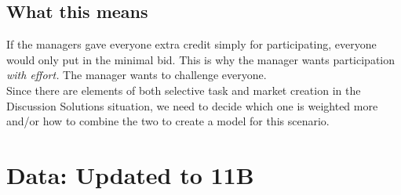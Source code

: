 \documentclass[leqno]{article}
\begin{document}
\subsection{What this means}
If the managers gave everyone extra credit simply for participating, everyone would only put in the minimal bid. This is why the manager wants participation \emph{with effort.} The manager wants to challenge everyone.\\

Since there are elements of both selective task and market creation in the Discussion Solutions situation, we need to decide which one is weighted more and/or how to combine the two to create a model for this scenario.

\section{Data: Updated to 11B}
\end{document}
